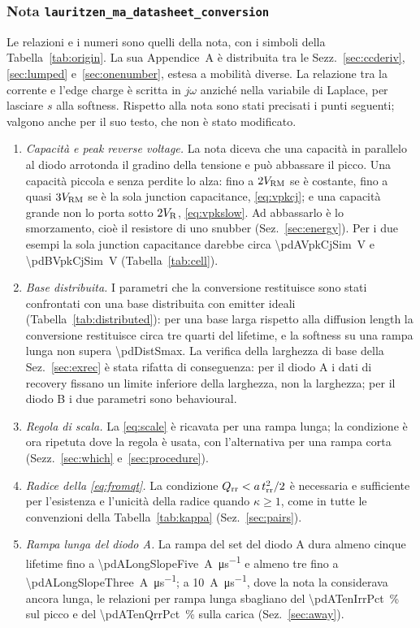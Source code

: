 \documentclass[10pt,a4paper]{scrartcl}
\let\newcommand\pdvaluedefine
\newcommand{\VR}{V_\mathrm{R}}
\newcommand{\Qrr}{Q_\mathrm{rr}}
\newcommand{\trr}{t_\mathrm{rr}}
\newcommand{\Vrm}{V_\mathrm{RM}}
\begin{document}
\subsubsection*{Nota \texttt{lauritzen\_ma\_datasheet\_conversion}}
Le relazioni e i numeri sono quelli della nota, con i simboli della Tabella~\ref{tab:origin}. La sua Appendice~A è distribuita tra le Sezz.~\ref{sec:ccderiv}, \ref{sec:lumped} e~\ref{sec:onenumber}, estesa a mobilità diverse. La relazione tra la corrente e l'edge charge è scritta in $j\omega$ anziché nella variabile di Laplace, per lasciare $s$ alla softness. Rispetto alla nota sono stati precisati i punti seguenti; valgono anche per il suo testo, che non è stato modificato.
\begin{enumerate}
\item \emph{Capacità e peak reverse voltage.} La nota diceva che una capacità in parallelo al diodo arrotonda il gradino della tensione e può abbassare il picco. Una capacità piccola e senza perdite lo alza: fino a $2\Vrm$ se è costante, fino a quasi $3\Vrm$ se è la sola junction capacitance, \eqref{eq:vpkcj}; e una capacità grande non lo porta sotto $2\VR$, \eqref{eq:vpkslow}. Ad abbassarlo è lo smorzamento, cioè il resistore di uno snubber (Sez.~\ref{sec:energy}). Per i due esempi la sola junction capacitance darebbe circa \SI{\pdAVpkCjSim}{\volt} e \SI{\pdBVpkCjSim}{\volt} (Tabella~\ref{tab:cell}).
\item \emph{Base distribuita.} I parametri che la conversione restituisce sono stati confrontati con una base distribuita con emitter ideali (Tabella~\ref{tab:distributed}): per una base larga rispetto alla diffusion length la conversione restituisce circa tre quarti del lifetime, e la softness su una rampa lunga non supera \num{\pdDistSmax}. La verifica della larghezza di base della Sez.~\ref{sec:exrec} è stata rifatta di conseguenza: per il diodo A i dati di recovery fissano un limite inferiore della larghezza, non la larghezza; per il diodo B i due parametri sono behavioural.
\item \emph{Regola di scala.} La \eqref{eq:scale} è ricavata per una rampa lunga; la condizione è ora ripetuta dove la regola è usata, con l'alternativa per una rampa corta (Sezz.~\ref{sec:which} e~\ref{sec:procedure}).
\item \emph{Radice della \eqref{eq:fromqt}.} La condizione $\Qrr < a\,\trr^2/2$ è necessaria e sufficiente per l'esistenza e l'unicità della radice quando $\kappa \geq 1$, come in tutte le convenzioni della Tabella~\ref{tab:kappa} (Sez.~\ref{sec:pairs}).
\item \emph{Rampa lunga del diodo A.} La rampa del set del diodo A dura almeno cinque lifetime fino a \SI{\pdALongSlopeFive}{\ampere\per\micro\second} e almeno tre fino a \SI{\pdALongSlopeThree}{\ampere\per\micro\second}; a \SI{10}{\ampere\per\micro\second}, dove la nota la considerava ancora lunga, le relazioni per rampa lunga sbagliano del \SI{\pdATenIrrPct}{\percent} sul picco e del \SI{\pdATenQrrPct}{\percent} sulla carica (Sez.~\ref{sec:away}).

\end{enumerate}
\end{document}
